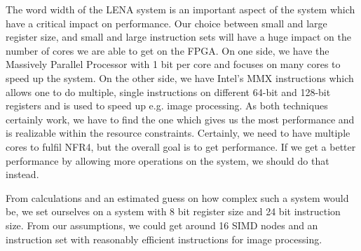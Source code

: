 The word width of the LENA system is an important aspect of the system which
have a critical impact on performance. Our choice between small and large
register size, and
small and large instruction sets will have a huge impact on the number of cores
we are able to get on the FPGA. On one side, we have the Massively Parallel
Processor\cite{potter1985mpp} with 1 bit per core and focuses on many cores to
speed up the system. On the other side, we have Intel's MMX instructions which
allows one to do multiple, single instructions on different 64-bit and 128-bit
registers and is used to speed up e.g. image processing\cite{lee2004h264}. As
both techniques certainly work, we have to find the one which gives us the most
performance and is realizable within the resource constraints. Certainly, we
need to have multiple cores to fulfil NFR4, but the overall goal is to get
performance. If we get a better performance by allowing more operations on the
system, we should do that instead.

From calculations and an estimated guess
on how complex such a system would be, we set ourselves on a system with 8 bit register size and 24 bit instruction
size. From our assumptions, we could get around 16 SIMD nodes and an instruction
set with reasonably efficient instructions for image processing.
